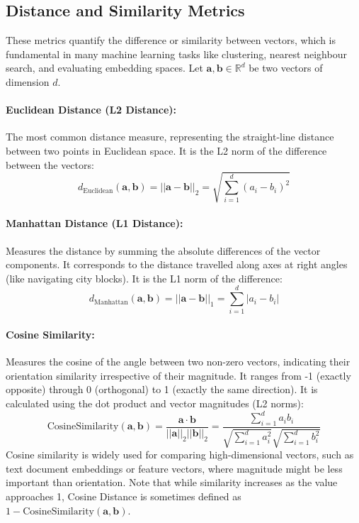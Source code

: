 \begin{appendices}
  \subsection{Distance and Similarity Metrics}
  \label{subsec:distance_metrics}
  These metrics quantify the difference or similarity between vectors, which is fundamental in many machine learning tasks like clustering, nearest neighbour search, and evaluating embedding spaces. Let \( \bm{a}, \bm{b} \in \mathbb{R}^d \) be two vectors of dimension \( d \).

  \paragraph{Euclidean Distance (L2 Distance):}
  \label{eq:euclidean_distance}
  The most common distance measure, representing the straight-line distance between two points in Euclidean space. It is the L2 norm of the difference between the vectors:
  \begin{equation}
    d_{\text{Euclidean}}(\bm{a}, \bm{b}) = ||\bm{a} - \bm{b}||_2 = \sqrt{\sum_{i=1}^d (a_i - b_i)^2}
  \end{equation}

  \paragraph{Manhattan Distance (L1 Distance):}
  Measures the distance by summing the absolute differences of the vector components. It corresponds to the distance travelled along axes at right angles (like navigating city blocks). It is the L1 norm of the difference:
  \begin{equation}
    d_{\text{Manhattan}}(\bm{a}, \bm{b}) = ||\bm{a} - \bm{b}||_1 = \sum_{i=1}^d |a_i - b_i|
  \end{equation}

  \paragraph{Cosine Similarity:}
  Measures the cosine of the angle between two non-zero vectors, indicating their orientation similarity irrespective of their magnitude. It ranges from -1 (exactly opposite) through 0 (orthogonal) to 1 (exactly the same direction). It is calculated using the dot product and vector magnitudes (L2 norms):
  \begin{equation}
    \text{CosineSimilarity}(\bm{a}, \bm{b}) = \frac{\bm{a} \cdot \bm{b}}{||\bm{a}||_2 ||\bm{b}||_2} = \frac{\sum_{i=1}^d a_i b_i}{\sqrt{\sum_{i=1}^d a_i^2} \sqrt{\sum_{i=1}^d b_i^2}}
  \end{equation}
  Cosine similarity is widely used for comparing high-dimensional vectors, such as text document embeddings or feature vectors, where magnitude might be less important than orientation. Note that while similarity increases as the value approaches 1, Cosine Distance is sometimes defined as \( 1 - \text{CosineSimilarity}(\bm{a}, \bm{b}) \).


\end{appendices}
